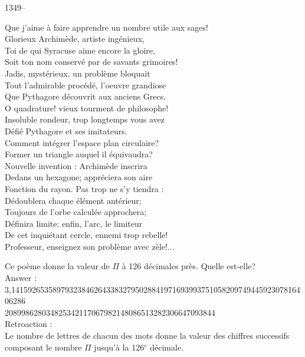 ﻿\documentclass[letterpaper, 12pt]{article}
\begin{document}
1349--\begin{center}{Que j'aime \`a faire apprendre un nombre utile aux
sages! \\
Glorieux Archim\`ede, artiste ing\'enieux,\\
Toi de qui Syracuse aime encore la gloire,\\
Soit ton nom conserv\'e par de savants grimoires! \\
Jadis, myst\'erieux, un probl\`eme bloquait \\
Tout l'admirable proc\'ed\'e, l'oeuvre grandiose\\
Que Pythagore d\'ecouvrit aux anciens Grecs. \\
O quadrature! vieux tourment de philosophe!\\
Insoluble rondeur, trop longtemps vous avez \\
D\'efi\'e Pythagore et ses imitateurs. \\
Comment int\'egrer l'espace plan circulaire?\\
Former un triangle auquel il \'equivaudra? \\
Nouvelle invention : Archim\`ede inscrira \\
Dedans un hexagone; appr\'eciera son aire \\
Fonction du rayon. Pas trop ne s'y tiendra :\\
D\'edoublera chaque \'el\'ement ant\'erieur; \\
Toujours de l'orbe calcul\'ee approchera;\\
D\'efinira limite; enfin, l'arc, le limiteur\\
De cet inqui\'etant cercle, ennemi trop rebelle!\\
Professeur, enseignez son probl\`eme avec z\`ele!...\\}
\end{center}
Ce po\`eme donne la valeur de $\Pi$ \`a 126  d\'ecimales pr\`es. Quelle
est-elle?\\

Answer : \\
3,141592653589793238462643383279502884197169399375105820974944592307816406286\\
208998628034825342117067982148086513282306647093844\\

Retroaction : \\

Le nombre de lettres de chacun des mots donne la valeur des chiffres
successifs composant le nombre $\Pi$ jusqu'\`a la 126$^e$ d\'ecimale.\\
\end{document}
